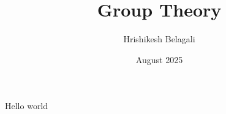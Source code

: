 \documentclass{article}
\title{Group Theory}
\author{Hrishikesh Belagali}
\date{August 2025}
\newcommand{\0}{\mathbf{0}} %
\begin{document}
\maketitle
Hello world 
\end{document}
